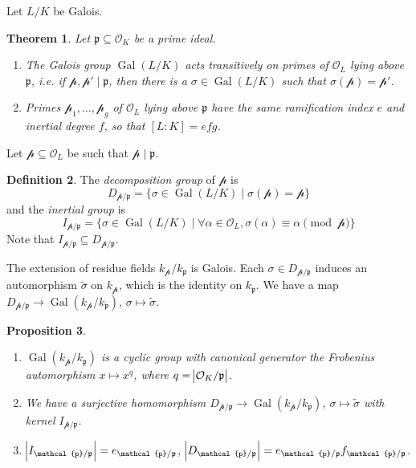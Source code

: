 \documentclass[11pt]{article}
\theoremstyle{definition}
\newtheorem{definition}{Definition}[section]
\theoremstyle{plain}
\newtheorem{theorem}[definition]{Theorem}
\newtheorem{proposition}[definition]{Proposition}
\theoremstyle{remark}
\DeclareMathOperator{\Gal}{Gal}
\newcommand{\cO}{\mathcal{O}}
\newcommand{\cp}{\mathcal{p}}
\newcommand{\fp}{\mathfrak{p}}
\begin{document}
Let $L/K$ be Galois.

\begin{theorem}\label{thm:1_2}
    Let $\fp \subseteq \cO_K$ be a prime ideal.
    \begin{enumerate}
        \item The Galois group $\Gal(L/K)$ acts transitively on primes of $\cO_L$ lying above $\fp$, i.e. if $\cp, \cp' \mid \fp$, then there is a $\sigma \in \Gal(L/K)$ such that $\sigma(\cp) = \cp'$.

        \item Primes $\cp_1, \ldots, \cp_g$ of $\cO_L$ lying above $\fp$ have the same ramification index $e$ and inertial degree $f$, so that $[L : K] = e f g$.
    \end{enumerate}
\end{theorem}

\noindent Let $\cp \subseteq \cO_L$ be such that $\cp \mid \fp$.

\begin{definition}
    The \emph{decomposition group} of $\cp$ is
    \begin{equation*}
        D_{\cp / \fp} = \{\sigma \in \Gal(L/K) \mid \sigma(\cp) = \cp\}
    \end{equation*}
    and the \emph{inertial group} is
    \begin{equation*}
        I_{\cp / \fp} = \{\sigma \in \Gal(L/K) \mid \forall \alpha \in \cO_L, \sigma(\alpha) \equiv \alpha \pmod{\cp}\}
    \end{equation*}
    Note that $I_{\cp/\fp} \subseteq D_{\cp/\fp}$.
\end{definition}

The extension of residue fields $k_\cp / k_\fp$ is Galois. Each $\sigma \in D_{\cp / \fp}$ induces an automorphism $\widetilde{\sigma}$ on $k_\cp$, which is the identity on $k_\fp$. We have a map $D_{\cp / \fp} \to \Gal(k_\cp / k_\fp)$, $\sigma \mapsto \widetilde{\sigma}$.

\begin{proposition}\label{prop:1_4}\phantom{}
    \begin{enumerate}
        \item $\Gal(k_\cp / k_\fp)$ is a cyclic group with canonical generator the Frobenius automorphism $x \mapsto x^q$, where $q = \abs{\cO_K / \fp}$.

        \item We have a surjective homomorphism $D_{\cp / \fp} \to \Gal(k_\cp / k_\fp)$, $\sigma \mapsto \widetilde{\sigma}$ with kernel $I_{\cp / \fp}$.

        \item $\abs{I_{\cp / \fp}} = e_{\cp / \fp}$, $\abs{D_{\cp / \fp}} = e_{\cp / \fp} f_{\cp / \fp}$.
    \end{enumerate}
\end{proposition}
\end{document}
